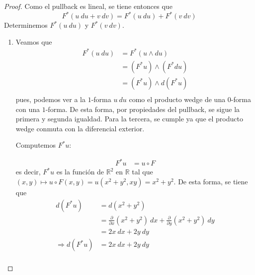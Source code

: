 \documentclass[12pt]{report}
\theoremstyle{largebreak}
\begin{document}
    \begin{proof}
        Como el pullback es lineal, se tiene entonces que
        \begin{equation*}
            F^*(u\:du+v\:dv)=F^*(u\:du)+F^*(v\:dv)
        \end{equation*}
        Determinemos $F^*(u\:du)$ y $F^*(v\:dv)$.
        \begin{enumerate}
            \item Veamos que
            \begin{equation*}
                \begin{split}
                    F^*(u\:du)&=F^*(u\wedge du)\\
                    &=(F^*u)\wedge(F^*du)\\
                    &=(F^*u)\wedge d(F^*u)\\
                \end{split}
            \end{equation*}
            pues, podemos ver a la $1$-forma $u\:du$ como el producto wedge de una $0$-forma con una $1$-forma. De esta forma, por propiedades del pullback, se sigue la primera y segunda igualdad. Para la tercera, se cumple ya que el producto wedge conmuta con la diferencial exterior.
            
            Computemos $F^*u$:

            \begin{equation*}
                \begin{split}
                    F^*u&=u\circ F
                \end{split}
            \end{equation*}
            es decir, $F^*u$ es la función de $\mathbb{R}^2$ en $\mathbb{R}$ tal que $(x,y)\mapsto u\circ F(x,y)=u(x^2+y^2,xy)=x^2+y^2$. De esta forma, se tiene que
            \begin{equation*}
                \begin{split}
                    d(F^*u)&=d(x^2+y^2)\\
                    &=\frac{\partial }{\partial x}(x^2+y^2)\:dx+\frac{\partial }{\partial y}(x^2+y^2)\:dy\\
                    &=2x\:dx+2y\:dy\\
                    \Rightarrow d(F^*u)&=2x\:dx+2y\:dy\\
                \end{split}
            \end{equation*}
            

\end{enumerate}
\end{proof}
\end{document}
